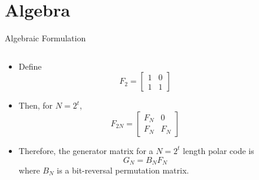 \documentclass[8pt, compress]{beamer}
\begin{document}
\section*{Algebra}

\begin{frame}{Algebraic Formulation}
    \begin{columns}
        \begin{column}{0.4\linewidth}
        \begin{itemize}
            \item<4-> Define
            $$
            F_2 = \begin{bmatrix} 1 & 0\\ 1 & 1 \end{bmatrix}
            $$
            \item<5-> Then, for $N = 2^t$,
            $$
            F_{2N} = \begin{bmatrix} F_N & 0\\ F_N & F_N \end{bmatrix}
            $$
            \item<6-> Therefore, the generator matrix for a $N = 2^t$ length polar code is
            $$
            G_N = B_N F_N
            $$
            where $B_N$ is a bit-reversal permutation matrix.
        \end{itemize}
        \end{column}
        \begin{column}{0.6\linewidth}
        \end{column}
    \end{columns}
\end{frame}
\end{document}
